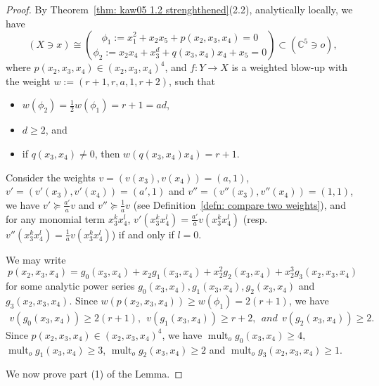 \documentclass[11pt]{amsart}
\numberwithin{equation}{section}
\newcommand{\mult}{\operatorname{mult}}
\theoremstyle{definition}
\theoremstyle{definition}
\begin{document}
\begin{proof}
By Theorem~\ref{thm: kaw05 1.2 strenghthened}(2.2), analytically locally, we have  $$(X\ni x)\cong \binom{\phi_1:= x_1^2+x_2x_5+p(x_2,x_3,x_4)=0}{\phi_2:= x_2x_4+x_3^d+q(x_3,x_4)x_4+x_5=0}\subset(\mathbb C^5\ni o),$$where $p(x_2,x_3,x_4)\in(x_2,x_3,x_4)^4$, and $f: Y\to X$ is a weighted blow-up with the weight $w:=(r+1,r,a,1,r+2)$, such that 
\begin{itemize}
    \item $w(\phi_2)=\frac{1}{2}w(\phi_1)=r+1=ad$,
    \item $d\geq 2$, and
    \item if $q(x_3,x_4)\not=0$, then $w(q(x_3,x_4)x_4)=r+1$.
\end{itemize}


Consider the weights $v=(v(x_3),v(x_4))=(a,1)$, $v'=(v'(x_3),v'(x_4))=(a',1)$ and $v''=(v''(x_3),v''(x_4))=(1,1)$, we have $v'\succeq \frac{a'}{a}v$ and $v''\succeq \frac{1}{a}v$ (see Definition~\ref{defn: compare two weights}), and for any monomial term $x_3^{k}x_4^l$, $v'(x_3^{k}x_4^l)=\frac{a'}{a}v(x_3^{k}x_4^l)$ (resp. $v''(x_3^{k}x_4^l)=\frac{1}{a}v(x_3^{k}x_4^l)$) if and only if $l=0$.

We may write $$p(x_2,x_3,x_4)=g_0(x_3,x_4)+x_2g_1(x_3,x_4)+x_2^2g_2(x_3,x_4)+x_2^3g_3(x_2,x_3,x_4)$$ for some analytic power series $g_0(x_3,x_4),g_1(x_3,x_4),g_2(x_3,x_4)$ and $g_3(x_2,x_3,x_4)$. Since $w(p(x_2,x_3,x_4))\geq w(\phi_1)=2(r+1)$, we have
\begin{align}\label{align: equation for cD case 2}
    v(g_0(x_3,x_4))\geq 2(r+1),\ \ v(g_1(x_3,x_4))\geq r+2,\ \ and\ \ v(g_2(x_3,x_4))\geq 2.
\end{align}
Since $p(x_2,x_3,x_4)\in (x_2,x_3,x_4)^4$, we have $\mult_o g_0(x_3,x_4)\geq 4$, $\mult_o g_1(x_3,x_4)\geq 3$, $\mult_o g_2(x_3,x_4)\geq 2$ and $\mult_o g_3(x_2,x_3,x_4)\geq 1$.

\medskip

We now prove part (1) of the Lemma. 


\end{proof}
\end{document}
